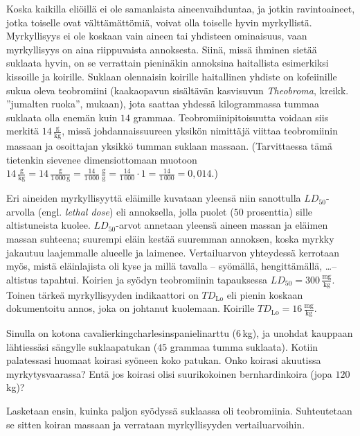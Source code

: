 %
%
%	

\newpage %
\begin{esimerkki}
Koska kaikilla eliöillä ei ole samanlaista aineenvaihduntaa, ja jotkin ravintoaineet, jotka toiselle ovat välttämättömiä, voivat olla toiselle hyvin myrkyllistä. Myrkyllisyys ei ole koskaan vain aineen tai yhdisteen ominaisuus, vaan myrkyllisyys on aina riippuvaista annoksesta. Siinä, missä ihminen sietää suklaata hyvin, on se verrattain pieninäkin annoksina haitallista esimerkiksi kissoille ja koirille. Suklaan olennaisin koirille haitallinen yhdiste on kofeiinille sukua oleva teobromiini (kaakaopavun sisältävän kasvisuvun \textit{Theobroma}, kreikk. ''jumalten ruoka'', mukaan), jota saattaa yhdessä kilogrammassa tummaa suklaata olla enemän kuin $14$ grammaa. Teobromiinipitoisuutta voidaan siis merkitä $14\,\frac{\text{g}}{\text{kg}}$, missä johdannaissuureen yksikön nimittäjä viittaa teobromiinin massaan ja osoittajan yksikkö tumman suklaan massaan. (Tarvittaessa tämä tietenkin sievenee dimensiottomaan muotoon $14\,\frac{\text{g}}{\text{kg}}=14\,\frac{\text{g}}{1\,000\,\text{g}}=\frac{14}{1\,000}\,\frac{\text{g}}{\text{g}}=\frac{14}{1\,000}\cdot 1=\frac{14}{1\,000}=0,014$.)

Eri aineiden myrkyllisyyttä eläimille kuvataan yleensä niin sanottulla $LD_{50}$-arvolla (engl. \textit{lethal dose}) eli annoksella, jolla puolet ($50$ prosenttia) sille altistuneista kuolee. $LD_{50}$-arvot annetaan yleensä aineen massan ja eläimen massan suhteena; suurempi eläin kestää suuremman annoksen, koska myrkky jakautuu laajemmalle alueelle ja laimenee. Vertailuarvon yhteydessä kerrotaan myös, mistä eläinlajista oli kyse ja millä tavalla -- syömällä, hengittämällä, \ldots -- altistus tapahtui. Koirien ja syödyn teobromiinin tapauksessa $LD_{50}=300\,\frac{\text{mg}}{\text{kg}}$. Toinen tärkeä myrkyllisyyden indikaattori on $T\!D_\text{Lo}$ eli pienin koskaan dokumentoitu annos, joka on johtanut kuolemaan. Koirille $T\!D_\text{Lo}=16\,\frac{\text{mg}}{\text{kg}}$.

Sinulla on kotona cavalierkingcharlesinspanielinarttu ($6$\,kg), ja unohdat kauppaan lähtiessäsi sängylle suklaapatukan ($45$ grammaa tumma suklaata). Kotiin palatessasi huomaat koirasi syöneen koko patukan. Onko koirasi akuutissa myrkytysvaarassa? Entä jos koirasi olisi suurikokoinen bernhardinkoira (jopa $120$\,kg)?
	\begin{esimratk}
	Lasketaan ensin, kuinka paljon syödyssä suklaassa oli teobromiinia. Suhteutetaan se sitten koiran massaan ja verrataan myrkyllisyyden vertailuarvoihin.
	

\end{esimratk}
\end{esimerkki}
